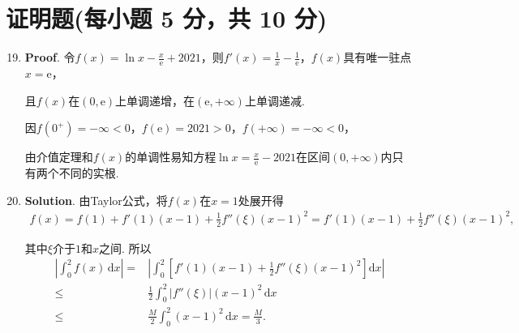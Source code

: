\documentclass[../Main.tex]{subfiles}
\begin{document}
\section{证明题(每小题 5 分，共 10 分)}
\begin{enumerate}
    \setcounter{enumi}{18}
    \item \textbf{Proof}. 令$f(x)=\ln x-\frac{x}{\mathrm{e}}+2021$，则$f'(x)
              =\frac{1}{x}-\frac{1}{\mathrm{e}}$，$f(x)$具有唯一驻点$x=\mathrm{e}$，

          且$f(x)$在$(0,\mathrm{e})$上单调递增，在$(\mathrm{e},+\infty)$上单调递减.

          因$f(0^{+})=-\infty<0$，$f(\mathrm{e})=2021>0$，$f(+\infty)=-\infty<0$，

          由介值定理和$f(x)$的单调性易知方程$\ln x = \frac{x}{\mathrm{e}}-2021$在区间$(
              0,+\infty)$内只有两个不同的实根.

    \item \textbf{Solution}. 由Taylor公式，将$f(x)$在$x=1$处展开得
          \[
              \begin{gathered}
                  f(x)=f(1)+f'(1)(x-1)+\frac{1}{2}f''(\xi)(x-1)^2=f'(1)(x-1)+\frac{1}{2}f''(\xi)(x-1)^2,
              \end{gathered}
          \]

          其中$\xi$介于$1$和$x$之间. 所以
          \[
              \begin{aligned}
                  \left|\int_{0}^{2}f(x)\,\mathrm{d}x\right| = & \left|\int_{0}^{2}\left[f'(1)(x-1)+\frac{1}{2}f''(\xi)(x-1)^{2}\right]\mathrm{d}x\right| \\
                  \leq                                         & \frac{1}{2}\int_{0}^{2}|f''(\xi)|(x-1)^{2}\,\mathrm{d}x                                  \\
                  \leq                                         & \frac{M}{2}\int_{0}^{2}(x-1)^{2}\,\mathrm{d}x = \frac{M}{3}.
              \end{aligned}
          \]
\end{enumerate}
\end{document}
